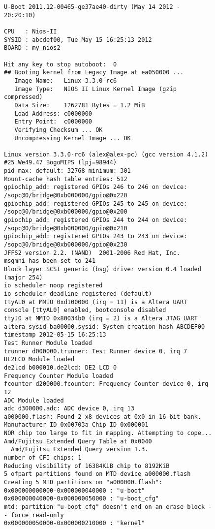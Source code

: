 \begin{figure}[h!]
\lstset{basicstyle=\tiny\ttfamily}
\begin{lstlisting}
U-Boot 2011.12-00465-ge37ae40-dirty (May 14 2012 - 20:20:10)

CPU   : Nios-II
SYSID : abcdef00, Tue May 15 16:25:13 2012
BOARD : my_nios2

Hit any key to stop autoboot:  0
## Booting kernel from Legacy Image at ea050000 ...
   Image Name:   Linux-3.3.0-rc6
   Image Type:   NIOS II Linux Kernel Image (gzip compressed)
   Data Size:    1262781 Bytes = 1.2 MiB
   Load Address: c0000000
   Entry Point:  c0000000
   Verifying Checksum ... OK
   Uncompressing Kernel Image ... OK

Linux version 3.3.0-rc6 (alex@alex-pc) (gcc version 4.1.2) #25 We49.47 BogoMIPS (lpj=98944)
pid_max: default: 32768 minimum: 301
Mount-cache hash table entries: 512
gpiochip_add: registered GPIOs 246 to 246 on device: /sopc@0/bridge@0xb000000/gpio@0x220
gpiochip_add: registered GPIOs 245 to 245 on device: /sopc@0/bridge@0xb000000/gpio@0x200
gpiochip_add: registered GPIOs 244 to 244 on device: /sopc@0/bridge@0xb000000/gpio@0x210
gpiochip_add: registered GPIOs 243 to 243 on device: /sopc@0/bridge@0xb000000/gpio@0x230
JFFS2 version 2.2. (NAND)  2001-2006 Red Hat, Inc.
msgmni has been set to 241
Block layer SCSI generic (bsg) driver version 0.4 loaded (major 254)
io scheduler noop registered
io scheduler deadline registered (default)
ttyAL0 at MMIO 0xd100000 (irq = 11) is a Altera UART
console [ttyAL0] enabled, bootconsole disabled
ttyJ0 at MMIO 0x80034b0 (irq = 2) is a Altera JTAG UART
altera_sysid ba00000.sysid: System creation hash ABCDEF00 timestamp 2012-05-15 16:25:13
Test Runner Module loaded
trunner d000000.trunner: Test Runner device 0, irq 7
DE2LCD Module loaded
de2lcd b000010.de2lcd: DE2 LCD 0
Frequency Counter Module loaded
fcounter d200000.fcounter: Frequency Counter device 0, irq 12
ADC Module loaded
adc d300000.adc: ADC device 0, irq 13
a000000.flash: Found 2 x8 devices at 0x0 in 16-bit bank. Manufacturer ID 0x00703a Chip ID 0x000001
NOR chip too large to fit in mapping. Attempting to cope...
Amd/Fujitsu Extended Query Table at 0x0040
  Amd/Fujitsu Extended Query version 1.3.
number of CFI chips: 1
Reducing visibility of 16384KiB chip to 8192KiB
5 ofpart partitions found on MTD device a000000.flash
Creating 5 MTD partitions on "a000000.flash":
0x000000000000-0x000000040000 : "u-boot"
0x000000040000-0x000000050000 : "u-boot_cfg"
mtd: partition "u-boot_cfg" doesn't end on an erase block -- force read-only
0x000000050000-0x000000210000 : "kernel"

\end{lstlisting}
\end{figure}

